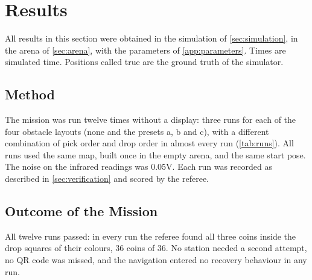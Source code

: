 \section{Results}
\label{sec:results}


All results in this section were obtained in the simulation of \cref{sec:simulation}, in
the arena of \cref{sec:arena}, with the parameters of \cref{app:parameters}. Times are
simulated time. Positions called true are the ground truth of the simulator.

\subsection{Method}
The mission was run twelve times without a display: three runs for each of the four
obstacle layouts (none and the presets a, b and c), with a different combination of pick
order and drop order in almost every run (\cref{tab:runs}). All runs used the same map,
built once in the empty arena, and the same start pose. The noise on the infrared readings
was 0.05\unit{V}. Each run was recorded as described in \cref{sec:verification} and scored
by the referee.

\subsection{Outcome of the Mission}
All twelve runs passed: in every run the referee found all three coins inside the drop
squares of their colours, 36 coins of 36. No station needed a second attempt, no QR code
was missed, and the navigation entered no recovery behaviour in any run.

